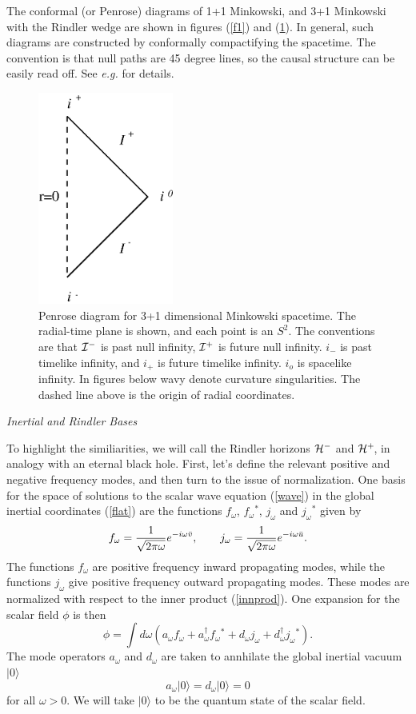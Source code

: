 \documentclass[12pt]{article}
\newcommand{\be}{\begin{equation}}
\newcommand{\ee}{\end{equation}}
\def\fh{{\cal H}^+}
\def\ph{{\cal H}^-}
\def\finf{{\cal I}^+}
\def\pinf{{\cal I}^-}
\def\f{f_{\omega}}
\def\j{j_{\omega}}
\def\a{a_\omega}
\def\d{d_{\omega}}
\def\ub{\bar u}
\def\vb{\bar v}
\begin{document}
The conformal (or Penrose) diagrams of  1+1 Minkowski, and 3+1 Minkowski with
the Rindler wedge are shown in figures (\ref{f1}) and (\ref{f2}). In general, such
diagrams are constructed
by conformally  compactifying the spacetime. The convention is that null paths
are 45 degree lines, so the causal structure can be easily read off.
See {\it e.g.} \cite{wald, he} for details.
%
\begin{figure}[tb]
\begin{center}
\includegraphics[width=1.75in]{flat.eps}
\end{center}
\caption{Penrose diagram for 3+1 dimensional Minkowski spacetime. The
radial-time plane is
shown, and each point is an $S^2$.
The conventions are that $\pinf$ is past null infinity, $\finf$ is future null
infinity. $i_-$ is past timelike infinity, and  $i_+$  is future timelike
infinity. $i_o$ is spacelike infinity. In figures below wavy denote curvature
singularities. The dashed line above is the  origin of radial coordinates.}
\label{f2}
\end{figure}
%
\vskip 0.1in\noindent
{\it Inertial and Rindler Bases}
\vskip 0.05in

To highlight the similiarities, we will call the Rindler horizons $\ph$
and $\fh\!$, in analogy with an eternal black hole.
First, let's define the relevant  positive and negative
frequency modes, and then turn to the issue of normalization. One basis
for the space of solutions to the scalar wave equation (\ref{wave}) in the
global inertial
coordinates (\ref{flat}) are the functions $\f$, $\f{}^*$, $\j$ and
$\j{}^*$ given by
%
\be\label{minkmode}\f ={1\over \sqrt{2\pi \omega} }e^{-i\omega \vb }, \qquad
\j = {1\over \sqrt{2\pi \omega} }e^{-i\omega \ub } .\ee
%
The functions $\f$ are positive frequency inward propagating modes, while
the functions
$\j$ give positive frequency outward propagating modes. These modes are
normalized with respect to the inner product (\ref{innprod}).
One expansion for the scalar field $\phi$ is then
%
\be\label{rinphi}\phi = \int d\omega (  \a \f + \a^{\dagger} \f{}^*  +
\d \j + \d^{\dagger} \j{}^* ) .\ee
%
\goodbreak\noindent
The mode operators $\a$ and $\d$ are taken to annhilate the global inertial vacuum $|0\rangle$
%
\be\label{advac} \a |0\rangle = \d |0\rangle =0\ee
%
for all $\omega>0$.  We will take $|0\rangle$ to be the quantum state of the scalar
field.
%
\end{document}
